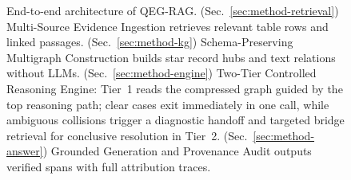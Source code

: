 \begin{figure}[t]
\centering
\resizebox{0.92\linewidth}{!}{}
\vspace{2.5mm}
\caption{End-to-end architecture of QEG-RAG. (Sec.~\ref{sec:method-retrieval}) Multi-Source Evidence Ingestion retrieves relevant table rows and linked passages. (Sec.~\ref{sec:method-kg}) Schema-Preserving Multigraph Construction builds star record hubs and text relations without LLMs. (Sec.~\ref{sec:method-engine}) Two-Tier Controlled Reasoning Engine: Tier~1 reads the compressed graph guided by the top reasoning path; clear cases exit immediately in one call, while ambiguous collisions trigger a diagnostic handoff and targeted bridge retrieval for conclusive resolution in Tier~2. (Sec.~\ref{sec:method-answer}) Grounded Generation and Provenance Audit outputs verified spans with full attribution traces.}
\vspace{-2mm}
\label{fig:pipeline}
\end{figure}
